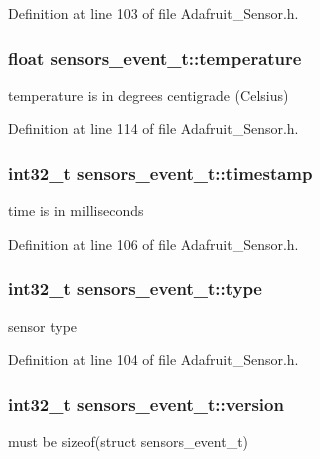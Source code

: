 Definition at line 103 of file Adafruit\+\_\+\+Sensor.\+h.

\subsubsection[{\texorpdfstring{temperature}{temperature}}]{\setlength{\rightskip}{0pt plus 5cm}float sensors\+\_\+event\+\_\+t\+::temperature}\hypertarget{structsensors__event__t_a914f76beb75bd99aa3c13d3a8e56e21c}{}\label{structsensors__event__t_a914f76beb75bd99aa3c13d3a8e56e21c}
temperature is in degrees centigrade (Celsius) 

Definition at line 114 of file Adafruit\+\_\+\+Sensor.\+h.

\subsubsection[{\texorpdfstring{timestamp}{timestamp}}]{\setlength{\rightskip}{0pt plus 5cm}int32\+\_\+t sensors\+\_\+event\+\_\+t\+::timestamp}\hypertarget{structsensors__event__t_acd3be1560458b3e3bf52f93f744e8238}{}\label{structsensors__event__t_acd3be1560458b3e3bf52f93f744e8238}
time is in milliseconds 

Definition at line 106 of file Adafruit\+\_\+\+Sensor.\+h.

\subsubsection[{\texorpdfstring{type}{type}}]{\setlength{\rightskip}{0pt plus 5cm}int32\+\_\+t sensors\+\_\+event\+\_\+t\+::type}\hypertarget{structsensors__event__t_a58401dd7f3400d9eb96c71b8fba9f8e8}{}\label{structsensors__event__t_a58401dd7f3400d9eb96c71b8fba9f8e8}
sensor type 

Definition at line 104 of file Adafruit\+\_\+\+Sensor.\+h.

\subsubsection[{\texorpdfstring{version}{version}}]{\setlength{\rightskip}{0pt plus 5cm}int32\+\_\+t sensors\+\_\+event\+\_\+t\+::version}\hypertarget{structsensors__event__t_a2134d60fdb21e3495c595a2df2f5cece}{}\label{structsensors__event__t_a2134d60fdb21e3495c595a2df2f5cece}
must be sizeof(struct sensors\+\_\+event\+\_\+t) 

